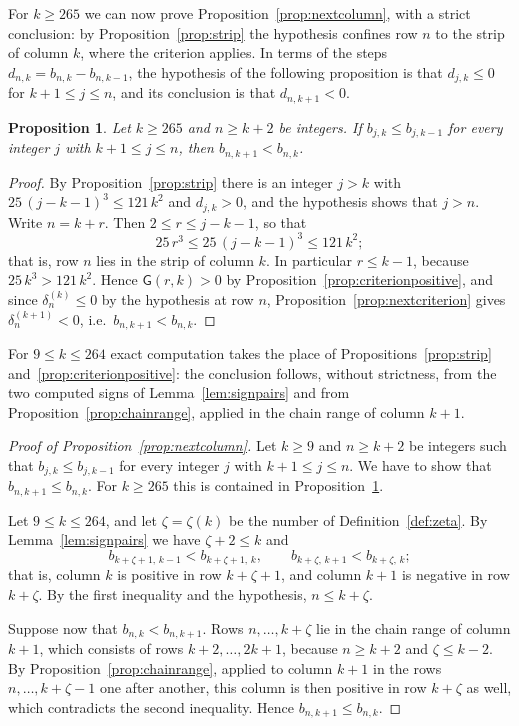 \documentclass{amsart}
\newtheorem{proposition}[theorem]{Proposition}
\theoremstyle{definition}
\theoremstyle{remark}
\numberwithin{equation}{section}
\begin{document}
For $k\ge 265$ we can now prove Proposition~\ref{prop:nextcolumn}, with a strict conclusion: by Proposition~\ref{prop:strip} the hypothesis confines row $n$ to the strip of column $k$, where the criterion applies. In terms of the steps $d_{n,k}=b_{n,k}-b_{n,k-1}$, the hypothesis of the following proposition is that $d_{j,k}\le 0$ for $k+1\le j\le n$, and its conclusion is that $d_{n,k+1}<0$.

\begin{proposition}\label{prop:nextlarge}
Let $k\ge 265$ and $n\ge k+2$ be integers. If $b_{j,k}\le b_{j,k-1}$ for every integer $j$ with $k+1\le j\le n$, then $b_{n,k+1}<b_{n,k}$.
\end{proposition}

\begin{proof}
By Proposition~\ref{prop:strip} there is an integer $j>k$ with $25\,(j-k-1)^3\le 121\,k^2$ and $d_{j,k}>0$, and the hypothesis shows that $j>n$. Write $n=k+r$. Then $2\le r\le j-k-1$, so that
\[
25\,r^3\le 25\,(j-k-1)^3\le 121\,k^2 ;
\]
that is, row $n$ lies in the strip of column $k$. In particular $r\le k-1$, because $25\,k^3>121\,k^2$. Hence $\mathsf G(r,k)>0$ by Proposition~\ref{prop:criterionpositive}, and since $\delta^{(k)}_n\le 0$ by the hypothesis at row $n$, Proposition~\ref{prop:nextcriterion} gives $\delta^{(k+1)}_n<0$, i.e.\ $b_{n,k+1}<b_{n,k}$.
\end{proof}

For $9\le k\le 264$ exact computation takes the place of Propositions~\ref{prop:strip} and~\ref{prop:criterionpositive}: the conclusion follows, without strictness, from the two computed signs of Lemma~\ref{lem:signpairs} and from Proposition~\ref{prop:chainrange}, applied in the chain range of column $k+1$.

\begin{proof}[Proof of Proposition~\ref{prop:nextcolumn}]
Let $k\ge 9$ and $n\ge k+2$ be integers such that $b_{j,k}\le b_{j,k-1}$ for every integer $j$ with $k+1\le j\le n$. We have to show that $b_{n,k+1}\le b_{n,k}$. For $k\ge 265$ this is contained in Proposition~\ref{prop:nextlarge}.

Let $9\le k\le 264$, and let $\zeta=\zeta(k)$ be the number of Definition~\ref{def:zeta}. By Lemma~\ref{lem:signpairs} we have $\zeta+2\le k$ and
\[
b_{k+\zeta+1,\,k-1}<b_{k+\zeta+1,\,k},\qquad b_{k+\zeta,\,k+1}<b_{k+\zeta,\,k};
\]
that is, column $k$ is positive in row $k+\zeta+1$, and column $k+1$ is negative in row $k+\zeta$. By the first inequality and the hypothesis, $n\le k+\zeta$.

Suppose now that $b_{n,k}<b_{n,k+1}$. Rows $n,\dots,k+\zeta$ lie in the chain range of column $k+1$, which consists of rows $k+2,\dots,2k+1$, because $n\ge k+2$ and $\zeta\le k-2$. By Proposition~\ref{prop:chainrange}, applied to column $k+1$ in the rows $n,\dots,k+\zeta-1$ one after another, this column is then positive in row $k+\zeta$ as well, which contradicts the second inequality. Hence $b_{n,k+1}\le b_{n,k}$.
\end{proof}
\end{document}
